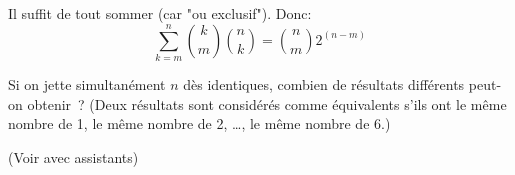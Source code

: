 Il suffit de tout sommer (car "ou exclusif"). Donc: \[ \sum_{k=m}^n {k \choose m}{n \choose k} = {n \choose m} 2^{(n-m)}\]

\vspace{1cm}


\begin{exo} 
Si on jette simultan\'ement $n$ d\`es identiques, combien de r\'esultats diff\'erents peut-on obtenir~? (Deux r\'esultats sont consid\'er\'es comme \'equivalents s'ils ont le m\^eme nombre de 1, le m\^eme nombre de 2, \ldots, le m\^eme nombre de 6.)
\end{exo}

(Voir avec assistants)